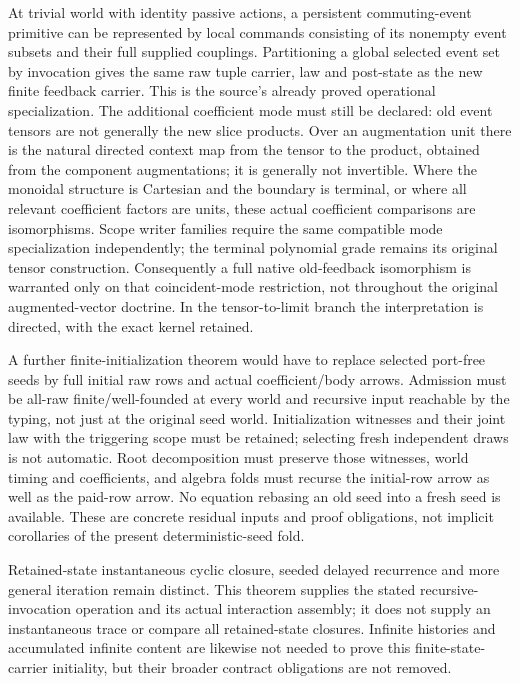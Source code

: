 \documentclass[11pt]{article}
\begin{document}
At trivial world with identity passive actions, a persistent commuting-event primitive can be represented by local commands consisting of its nonempty event subsets and their full supplied couplings. Partitioning a global selected event set by invocation gives the same raw tuple carrier, law and post-state as the new finite feedback carrier. This is the source's already proved operational specialization. The additional coefficient mode must still be declared: old event tensors are not generally the new slice products. Over an augmentation unit there is the natural directed context map from the tensor to the product, obtained from the component augmentations; it is generally not invertible. Where the monoidal structure is Cartesian and the boundary is terminal, or where all relevant coefficient factors are units, these actual coefficient comparisons are isomorphisms. Scope writer families require the same compatible mode specialization independently; the terminal polynomial grade remains its original tensor construction. Consequently a full native old-feedback isomorphism is warranted only on that coincident-mode restriction, not throughout the original augmented-vector doctrine. In the tensor-to-limit branch the interpretation is directed, with the exact kernel retained.

A further finite-initialization theorem would have to replace selected port-free seeds by full initial raw rows and actual coefficient/body arrows. Admission must be all-raw finite/well-founded at every world and recursive input reachable by the typing, not just at the original seed world. Initialization witnesses and their joint law with the triggering scope must be retained; selecting fresh independent draws is not automatic. Root decomposition must preserve those witnesses, world timing and coefficients, and algebra folds must recurse the initial-row arrow as well as the paid-row arrow. No equation rebasing an old seed into a fresh seed is available. These are concrete residual inputs and proof obligations, not implicit corollaries of the present deterministic-seed fold.

Retained-state instantaneous cyclic closure, seeded delayed recurrence and more general iteration remain distinct. This theorem supplies the stated recursive-invocation operation and its actual interaction assembly; it does not supply an instantaneous trace or compare all retained-state closures. Infinite histories and accumulated infinite content are likewise not needed to prove this finite-state-carrier initiality, but their broader contract obligations are not removed.
\end{document}

